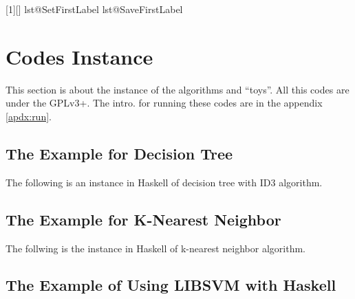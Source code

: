 \documentclass[twoside]{article}
\begin{document}
\begin{appendix}
	\setcounter{codeline}{1}
	\setcounter{lstnumber}{1}
	[]
	{ \setcounter{lstnumber}{\value{codeline}}
		\csname lst@SetFirstLabel\endcsname}
	{ \csname lst@SaveFirstLabel\endcsname
		\setcounter{codeline}{\value{lstnumber}}
	}
	
	\section{Codes Instance}
	\label{apdx:codes}
	
	This section is about the instance of the algorithms and ``toys''.
	All this codes are under the  GPLv3+.
	The intro. for running these codes are in the appendix \ref{apdx:run}.	
	
	\subsection{The Example for Decision Tree}
	\label{code:dc}
	
	The following is an instance in Haskell of decision tree with ID3 algorithm.
	
	
	
	\subsection{The Example for  K-Nearest Neighbor}
	\label{code:knn}
	
	The follwing is the instance in Haskell of k-nearest neighbor algorithm.
	
	
	\subsection{The Example of Using LIBSVM with Haskell}
	\label{code:svm}
	

\end{appendix}
\end{document}
